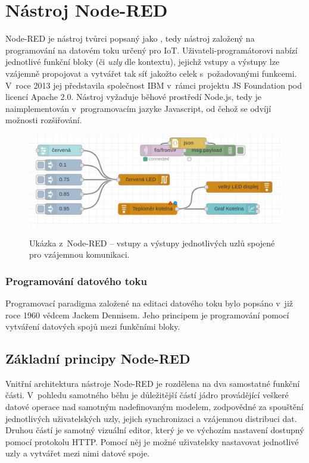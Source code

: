 \chapter{Nástroj Node-RED}
\label{ch:nastroj-node-red}

Node-RED je nástroj tvůrci popsaný jako , tedy nástroj založený na
programování na datovém toku určený pro IoT. Uživateli-programátorovi nabízí jednotlivé funkční bloky (či \emph{uzly} dle kontextu),
jejichž vstupy a výstupy lze vzájemně propojovat a vytvářet tak síť jakožto celek s~požadovanými funkcemi. V~roce 2013 jej představila
společnost IBM v~rámci projektu JS Foundation pod licencí Apache 2.0. Nástroj vyžaduje běhové prostředí Node.js, tedy je
naimplementován v~programovacím jazyke Javascript, od čehož se odvíjí možnosti rozšiřování.

\begin{figure}
    \includegraphics[width=\textwidth]{figures/node-red-example.png}
    \label{fig-node-red-example}
    \caption{Ukázka z~Node-RED -- vstupy a výstupy jednotlivých uzlů spojené pro vzájemnou komunikaci.}
\end{figure}

\subsection{Programování datového toku}
Programovací paradigma založené na editaci datového toku bylo popsáno v~již roce 1960 vědcem Jackem Dennisem. Jeho
principem je programování pomocí vytváření datových spojů mezi funkčními bloky.

\section{Základní principy Node-RED}

Vnitřní architektura nástroje Node-RED je rozdělena na dva samostatné funkční části. V~pohledu samotného běhu je
důležitější částí jádro provádějící veškeré datové operace nad samotným nadefinovaným modelem, zodpovědné za spouštění
jednotlivých uživatelských uzly, jejich synchronizaci a vzájemnou distribuci dat. Druhou částí je samotný vizuální
editor, který je ve výchozím nastavení dostupný pomocí protokolu HTTP. Pomocí něj je možné uživatelsky nastavovat
jednotlivé uzly a vytvářet mezi nimi datové spoje.

